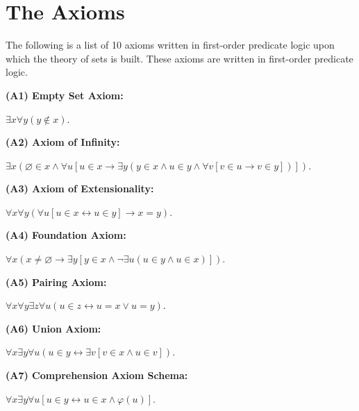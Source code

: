 \documentclass[12pt, a4paper]{article}
\begin{document}
\section{The Axioms}

The following is a list of 10 axioms written in first-order predicate logic upon which the theory of sets is built. These axioms are written in first-order predicate logic.\par

\vspace{6mm}

\begin{description}
    
    \item\textbf{(A1) Empty Set Axiom: }\par\vspace{4mm}\centerline{$\exists x\forall y(y\notin x)$.}
    
    \item\textbf{(A2) Axiom of Infinity: }\par\vspace{4mm}\centerline{$\exists x(\varnothing\in x\wedge\forall u[u\in x\rightarrow\exists y(y\in x\wedge u\in y\wedge\forall v[v\in u\rightarrow v\in y])])$.}
    
    \item\textbf{(A3) Axiom of Extensionality: }\par\vspace{4mm}\centerline{$\forall x\forall y(\forall u[u\in x\leftrightarrow u\in y]\rightarrow x=y)$.}
    
    \item\textbf{(A4) Foundation Axiom: }\par\vspace{4mm}\centerline{$\forall x(x\neq\varnothing\rightarrow\exists y[y\in x\wedge\neg\exists u(u\in y\wedge u\in x)])$.}
    
    \item\textbf{(A5) Pairing Axiom: }\par\vspace{4mm}\centerline{$\forall x\forall y\exists z\forall u(u\in z\leftrightarrow u= x\vee u= y)$.}
    
    \item\textbf{(A6) Union Axiom: }\par\vspace{4mm}\centerline{$\forall x\exists y\forall u(u\in y\leftrightarrow\exists v[v\in x\wedge u\in v])$.}
    
    \item\textbf{(A7) Comprehension Axiom Schema: }\par\vspace{4mm}\centerline{$\forall x\exists y\forall u[u\in y\leftrightarrow u\in x\wedge\varphi(u)]$.}
    

\end{description}
\end{document}
